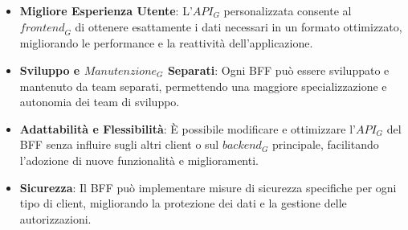 \begin{itemize}
    \item \textbf{Migliore Esperienza Utente}: L'$\textit{API}_G$ personalizzata consente al $\textit{frontend}_G$ di ottenere esattamente i dati necessari in un formato ottimizzato, migliorando le performance e la reattività dell'applicazione.
    \item \textbf{Sviluppo e $\textit{Manutenzione}_G$ Separati}: Ogni BFF può essere sviluppato e mantenuto da team separati, permettendo una maggiore specializzazione e autonomia dei team di sviluppo.
    \item \textbf{Adattabilità e Flessibilità}: È possibile modificare e ottimizzare l'$\textit{API}_G$ del BFF senza influire sugli altri client o sul $\textit{backend}_G$ principale, facilitando l'adozione di nuove funzionalità e miglioramenti.
    \item \textbf{Sicurezza}: Il BFF può implementare misure di sicurezza specifiche per ogni tipo di client, migliorando la protezione dei dati e la gestione delle autorizzazioni.
\end{itemize}

